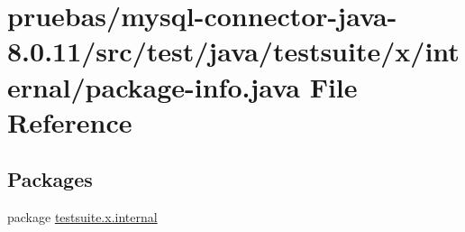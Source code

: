 \hypertarget{test_2java_2testsuite_2x_2internal_2package-info_8java}{}\section{pruebas/mysql-\/connector-\/java-\/8.0.11/src/test/java/testsuite/x/internal/package-\/info.java File Reference}
\label{test_2java_2testsuite_2x_2internal_2package-info_8java}
\subsection*{Packages}
\begin{DoxyCompactItemize}
\item 
package \mbox{\hyperlink{namespacetestsuite_1_1x_1_1internal}{testsuite.\+x.\+internal}}
\end{DoxyCompactItemize}
